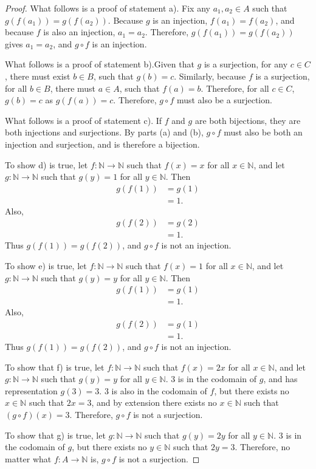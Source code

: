 \documentclass{amsart}
\newcommand{\N}{\mathbb N}
\newcommand{\1}{\mathds{1}}
\def \N {{\mathbb {N}}}
\numberwithin{equation}{section}
\numberwithin{theorem}{section}
\begin{document}
\begin{proof}
	What follows is a proof of statement a). Fix any $a_1,a_2\in A$ such that $g(f(a_1)) = g(f(a_2))$. Because $g$ is an injection, $f(a_1) = f(a_2)$, and because $f$ is also an injection, $a_1 = a_2$. Therefore, $g(f(a_1)) = g(f(a_2))$ gives $a_1 = a_2$, and $g\circ f$ is an injection.

	What follows is a proof of statement b).Given that $g$ is a surjection, for any $c\in C$, there must exist $b\in B$, such that $g(b) = c$. Similarly, because $f$ is a surjection, for all $b\in B$, there must $a\in A$, such that $f(a) = b$. Therefore, for all $c\in C$, $g(b) = c$ as $g(f(a)) = c$. Therefore, $g\circ f$ must also be a surjection.

	What follows is a proof of statement c). If $f$ and $g$ are both bijections, they are both injections and surjections. By parts (a) and (b), $g\circ f$ must also be both an injection and surjection, and is therefore a bijection.

	To show d) is true, let $f:\N\to\N$ such that $f(x)=x$ for all $x\in\N$, and let $g:\N\to\N$ such that $g(y)=1$ for all $y\in\N$. Then 
	\[
	\begin{split}
		g(f(1)) &= g(1)
		\\
		&= 1.
	\end{split}		
	\]
	Also,  
	\[\begin{split}
		g(f(2)) &= g(2)\\
		&= 1.
	\end{split}\]
	Thus $g(f(1))=g(f(2))$, and $g\circ f$ is not an injection.

	To show e) is true, let $f:\N\to\N$ such that $f(x)=1$ for all $x\in\N$, and let $g:\N\to\N$ such that $g(y)=y$ for all $y\in\N$. Then
	\[
	\begin{split}
		g(f(1)) &= g(1)
		\\
		&= 1.
	\end{split}		
	\]
	Also,  
	\[\begin{split}
		g(f(2)) &= g(1)\\
		&= 1.
	\end{split}\]
	Thus $g(f(1))=g(f(2))$, and $g\circ f$ is not an injection.

	To show that f) is true, let $f:\N\to\N$ such that $f(x)=2x$ for all $x\in\N$, and let $g:\N\to\N$ such that $g(y)=y$ for all $y\in\N$. $3$ is in the codomain of $g$, and has representation $g(3) = 3$. $3$ is also in the codomain of $f$, but there exists no $x\in\N$ such that $2x = 3$, and by extension there exists no $x\in\N$ such that $(g\circ f)(x) = 3$. Therefore, $g\circ f$ is not a surjection.

	To show that g) is true, let $g:\N\to\N$ such that $g(y)=2y$ for all $y\in\N$. $3$ is in the codomain of $g$, but there exists no $y\in\N$ such that $2y = 3$. Therefore, no matter what $f:A\to\N$ is, $g\circ f$ is not a surjection.
\end{proof}
\end{document}
